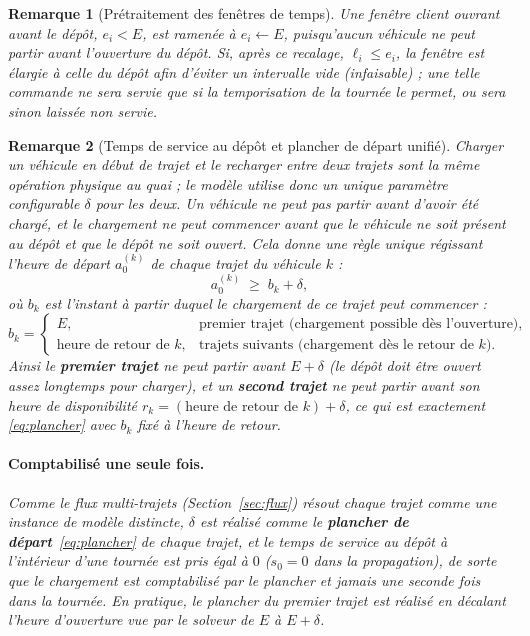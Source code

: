 \documentclass[12pt,a4paper]{report}
\newtheorem{remarque}{Remarque}
\begin{document}
\begin{remarque}[Prétraitement des fenêtres de temps]
Une fenêtre client ouvrant avant le dépôt, $e_i < E$, est ramenée à
$e_i \leftarrow E$, puisqu'aucun véhicule ne peut partir avant l'ouverture
du dépôt. Si, après ce recalage, $\ell_i \leq e_i$, la fenêtre est élargie à
celle du dépôt afin d'éviter un intervalle vide (infaisable) ; une telle
commande ne sera servie que si la temporisation de la tournée le permet, ou
sera sinon laissée non servie.
\end{remarque}

\begin{remarque}[Temps de service au dépôt et plancher de départ unifié]
\label{rem:depot}
Charger un véhicule en début de trajet et le recharger entre deux trajets
sont la même opération physique au quai ; le modèle utilise donc un unique
paramètre configurable $\delta$ pour les deux. Un véhicule ne peut pas
partir avant d'avoir été chargé, et le chargement ne peut commencer avant
que le véhicule ne soit présent au dépôt et que le dépôt ne soit ouvert.
Cela donne une règle unique régissant l'heure de départ $a_0^{(k)}$ de
\emph{chaque} trajet du véhicule $k$ :
%
\begin{equation}
  a_0^{(k)} \;\geq\; b_k + \delta,
  \label{eq:plancher}
\end{equation}
%
où $b_k$ est l'instant à partir duquel le chargement de ce trajet peut
commencer :
%
\[
  b_k =
  \begin{cases}
    E, & \text{premier trajet (chargement possible dès l'ouverture),}\\[2pt]
    \text{heure de retour de } k, & \text{trajets suivants (chargement dès le retour de $k$).}
  \end{cases}
\]
%
Ainsi le \textbf{premier trajet} ne peut partir avant $E + \delta$ (le dépôt
doit être ouvert assez longtemps pour charger), et un \textbf{second trajet}
ne peut partir avant son heure de disponibilité
$r_k = (\text{heure de retour de } k) + \delta$, ce qui est exactement
\eqref{eq:plancher} avec $b_k$ fixé à l'heure de retour.

\paragraph{Comptabilisé une seule fois.}
Comme le flux multi-trajets (Section~\ref{sec:flux}) résout chaque trajet
comme une instance de modèle distincte, $\delta$ est réalisé comme le
\textbf{plancher de départ}~\eqref{eq:plancher} de chaque trajet, et le
temps de service au dépôt \emph{à l'intérieur} d'une tournée est pris égal à
$0$ ($s_0 = 0$ dans la propagation), de sorte que le chargement est
comptabilisé par le plancher et jamais une seconde fois dans la tournée. En
pratique, le plancher du premier trajet est réalisé en décalant l'heure
d'ouverture vue par le solveur de $E$ à $E + \delta$.


\end{remarque}
\end{document}
